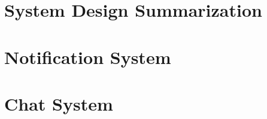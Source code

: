 
\chapter{System Design Summarization}\label{ch:summary}


\chapter{Notification System}

\chapter{Chat System}
